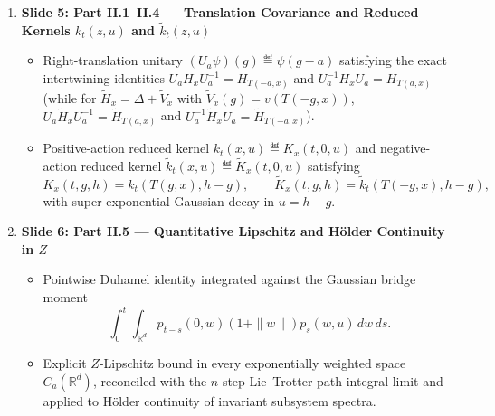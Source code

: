 \begin{enumerate}
  \item \textbf{Slide 5: Part II.1--II.4 --- Translation Covariance and Reduced Kernels $k_t(z, u)$ and $\widetilde{k}_t(z, u)$}
  \begin{itemize}
    \item Right-translation unitary $(U_a \psi)(g) \eqdef \psi(g - a)$ satisfying the exact intertwining identities $U_a H_x U_a^{-1} = H_{T(-a, x)}$ and $U_a^{-1} H_x U_a = H_{T(a, x)}$ (while for $\widetilde{H}_x = \Delta + \widetilde{V}_x$ with $\widetilde{V}_x(g) = v(T(-g, x))$, $U_a \widetilde{H}_x U_a^{-1} = \widetilde{H}_{T(a, x)}$ and $U_a^{-1} \widetilde{H}_x U_a = \widetilde{H}_{T(-a, x)}$).
    \item Positive-action reduced kernel $k_t(x, u) \eqdef K_x(t, 0, u)$ and negative-action reduced kernel $\widetilde{k}_t(x, u) \eqdef \widetilde{K}_x(t, 0, u)$ satisfying
    \[
      K_x(t, g, h) = k_t(T(g, x), h - g),
      \qquad
      \widetilde{K}_x(t, g, h) = \widetilde{k}_t(T(-g, x), h - g),
    \]
    with super-exponential Gaussian decay in $u = h - g$.
  \end{itemize}

  \item \textbf{Slide 6: Part II.5 --- Quantitative Lipschitz and H\"older Continuity in $Z$}
  \begin{itemize}
    \item Pointwise Duhamel identity integrated against the Gaussian bridge moment
    \[
      \int_0^t \int_{\mathbb{R}^d} p_{t-s}(0, w)(1 + \|w\|)p_s(w, u)\,dw\,ds.
    \]
    \item Explicit $Z$-Lipschitz bound in every exponentially weighted space $C_a(\mathbb{R}^d)$, reconciled with the $n$-step Lie--Trotter path integral limit and applied to H\"older continuity of invariant subsystem spectra.
  \end{itemize}
\end{enumerate}
